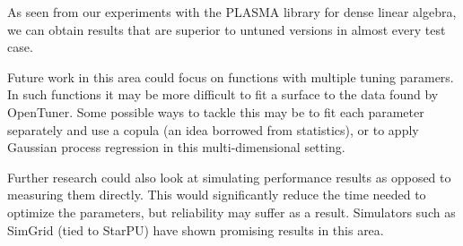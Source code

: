 \documentclass[a4paper,12pt]{article}
\begin{document}
As seen from our experiments with the PLASMA library
for dense linear algebra,
we can obtain results that are superior to untuned versions
in almost every test case.

Future work in this area could focus on functions with multiple
tuning paramers.
In such functions it may be more difficult
to fit a surface to the data found by OpenTuner.
Some possible ways to tackle this may be to fit
each parameter separately and use a copula
(an idea borrowed from statistics),
or to apply Gaussian process regression in this
multi-dimensional setting.

Further research could also look at simulating performance results
as opposed to measuring them directly.
This would significantly reduce the time needed to optimize
the parameters,
but reliability may suffer as a result.
Simulators such as SimGrid (tied to StarPU) have shown
promising results in this area.




\end{document}
